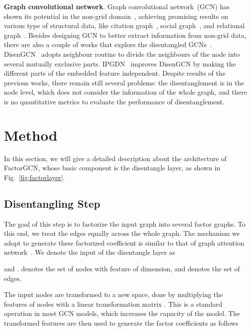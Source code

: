 \documentclass{article}
\begin{document}
\textbf{Graph convolutional network}.
Graph convolutional network~(GCN) has shown its potential in the
non-grid domain~\citep{xu2018powerful,Qiu2020ECCV,li2018combinatorial,yang2020distilling,monti2017geometricMoNet,ijcai_spagan}, achieving promising results on various type of 
structural data, like citation graph~\citep{velickovic2018graphgat}, 
social graph~\citep{kipf2017semi}, 
and relational graph~\citep{schlichtkrull2018modeling}.
Besides designing GCN to better extract information from
non-grid data, there are also a couple of works that explore the 
disentangled GCNs~\citep{ma2019learning,liu2019independence}. 
DisenGCN~\citep{ma2019disentangled} adopts 
neighbour routine to divide the neighbours of the node 
into several mutually exclusive parts.
IPGDN~\citep{liu2019independence} improves DisenGCN
by making the different parts of the embedded feature
independent. Despite results of the previous works, there
remain still several problems: 
the disentanglement is 
in the node level, which does not consider the information of
the whole graph,
and there is no quantitative metrics to evaluate
the performance of disentanglement.


\section{Method}



In this section, we will give a detailed description 
about the architecture of FactorGCN, whose basic component 
is the disentangle layer, as shown in Fig.~\ref{fig:factorlayer}.



\subsection{{Disentangling Step}}
The goal of this step is to factorize the input graph into several factor graphs.
To this end, we treat the edges equally across the whole graph.
The mechanism we adopt to
generate these factorized coefficient is
similar to that of graph attention network~\citep{velickovic2018graphgat}.
We denote the input of the disentangle layer as
 
and 
.
 denotes the set of nodes with feature of  dimension, and 
 denotes the set of edges. 


The input nodes are transformed to a new space,  done by multiplying the 
features of nodes with a linear transformation matrix 
. 
This is a standard operation in most GCN models, which increases the capacity of the model.
The transformed features are then used to 
generate the factor coefficients as follows
\end{document}
